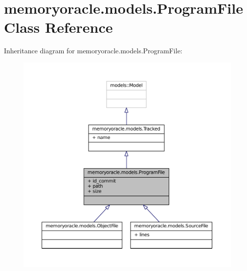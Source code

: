 \hypertarget{classmemoryoracle_1_1models_1_1ProgramFile}{}\section{memoryoracle.\+models.\+Program\+File Class Reference}
\label{classmemoryoracle_1_1models_1_1ProgramFile}


Inheritance diagram for memoryoracle.\+models.\+Program\+File\+:\nopagebreak
\begin{figure}[H]
\begin{center}
\leavevmode
\includegraphics[width=350pt]{classmemoryoracle_1_1models_1_1ProgramFile__inherit__graph}
\end{center}
\end{figure}


